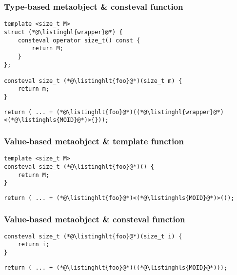 \documentclass[compress,table,xcolor=table]{beamer}
\begin{document}
\begin{frame}[fragile]
  \frametitle{Type-based metaobject \& consteval function}
  \begin{lstlisting}[language=c++2x,basicstyle=\normalsize\ttfamily]
template <size_t M>
struct (*@\listinghl{wrapper}@*) {
	consteval operator size_t() const {
		return M;
	}
};

consteval size_t (*@\listinghlt{foo}@*)(size_t m) {
	return m;
}
  \end{lstlisting}
  \vfill
  \begin{lstlisting}[language=c++2x,basicstyle=\normalsize\ttfamily]
return ( ... + (*@\listinghlt{foo}@*)((*@\listinghl{wrapper}@*)<(*@\listinghls{MOID}@*)>{}));
  \end{lstlisting}
\end{frame}
\begin{frame}[fragile]
  \frametitle{Value-based metaobject \& template function}
  \begin{lstlisting}[language=c++2x,basicstyle=\normalsize\ttfamily]
template <size_t M>
consteval size_t (*@\listinghlt{foo}@*)() {
	return M;
}
  \end{lstlisting}
  \vfill
  \begin{lstlisting}[language=c++2x,basicstyle=\normalsize\ttfamily]
return ( ... + (*@\listinghlt{foo}@*)<(*@\listinghls{MOID}@*)>());
  \end{lstlisting}
\end{frame}
\begin{frame}[fragile]
  \frametitle{Value-based metaobject \& consteval function}
  \begin{lstlisting}[language=c++2x,basicstyle=\normalsize\ttfamily]
consteval size_t (*@\listinghlt{foo}@*)(size_t i) {
	return i;
}
  \end{lstlisting}
  \vfill
  \begin{lstlisting}[language=c++2x,basicstyle=\normalsize\ttfamily]
return ( ... + (*@\listinghlt{foo}@*)((*@\listinghls{MOID}@*)));
  \end{lstlisting}
\end{frame}
\end{document}
